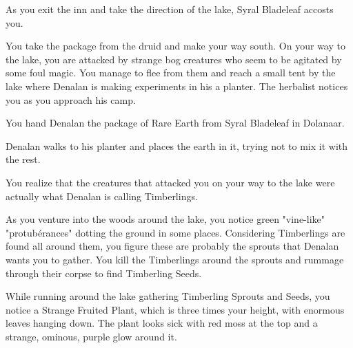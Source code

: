 As you exit the inn and take the direction of the lake, Syral Bladeleaf accosts you.


You take the package from the druid and make your way south. On your way to the lake, you are attacked by strange bog creatures who seem to be agitated by some foul magic. You manage to flee from them and reach a small tent by the lake where Denalan is making experiments in his a planter. The herbalist notices you as you approach his camp.


You hand Denalan the package of Rare Earth from Syral Bladeleaf in Dolanaar.



Denalan walks to his planter and places the earth in it, trying not to mix it with the rest.





You realize that the creatures that attacked you on your way to the lake were actually what Denalan is calling Timberlings.


As you venture into the woods around the lake, you notice green "vine-like" "protubérances" dotting the ground in some places. Considering Timberlings are found all around them, you figure these are probably the sprouts that Denalan wants you to gather. You kill the Timberlings around the sprouts and rummage through their corpse to find Timberling Seeds.

While running around the lake gathering Timberling Sprouts and Seeds, you notice a Strange Fruited Plant, which is three times your height, with enormous leaves hanging down. The plant looks sick with red moss at the top and a strange, ominous, purple glow around it.


